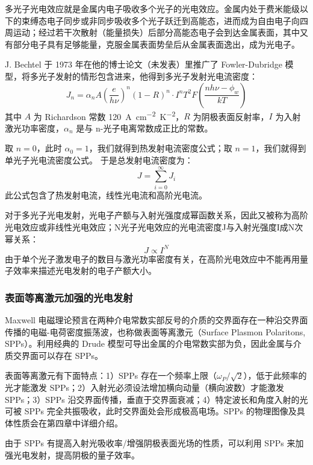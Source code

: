 多光子光电效应就是金属内电子吸收多个光子的光电效应。金属内处于费米能级以下的束缚态电子同步或非同步吸收多个光子跃迁到高能态，进而成为自由电子向四周运动；经过若干次散射（能量损失）后部分高能态电子会到达金属表面，其中又有部分电子具有足够能量，克服金属表面势垒后从金属表面逸出，成为光电子。

	J. Bechtel 于 1973 年在他的博士论文（未发表）里推广了 Fowler-Dubridge 模型\cite{bechtel1975four,bechtel1977two}，将多光子发射的情形包含进来，他得到多光子发射光电流密度：
\begin{equation}
J_n = \alpha_nA\left(\frac{e}{h\nu}\right)^n(1-R)^n\cdot I^nT^2F\left(\frac{nh\nu-\phi_w}{kT}\right)
\label{eq:multi-emission}
\end{equation}
其中 $A$ 为 Richardson 常数 \SI{120}{A.cm^{-2}.K^{-2}}，$R$ 为阴极表面反射率，$I$ 为入射激光功率密度，$\alpha_n$ 是与 n-光子电离常数成正比的常数。
	
	取 $n=0$，此时 $\alpha_0 = 1$，我们就得到热发射电流密度公式；取 $n=1$，我们就得到单光子光电流密度公式。
	于是总发射电流密度为：
	\begin{equation}
	J = \sum_{i = 0}^{\infty}J_i
	\end{equation}
	此公式包含了热发射电流，线性光电流和高阶光电流。

对于多光子光电发射，光电子产额与入射光强度成幂函数关系，因此又被称为高阶光电效应或非线性光电效应；N光子光电效应的光电流密度J与入射光强度I成N次幂关系：
\[
J \propto I^N
\]
由于单个光子激发电子的数目与激光功率密度有关，在高阶光电效应中不能再用量子效率来描述光电发射的电子产额大小。

\subsubsection{表面等离激元加强的光电发射}
Maxwell 电磁理论预言在两种介电常数实部反号的介质的交界面存在一种沿交界面传播的电磁-电荷密度振荡波，也称做表面等离激元（Surface Plasmon Polaritons, SPPs）\cite{Ritchie:1957aa,Barnes:2003aa,Maier:2007ab,Pitarke:2007aa}。利用经典的 Drude 模型可导出金属的介电常数实部为负，因此金属与介质交界面可以存在 SPPs。

表面等离激元有下面特点：1）SPPs 存在一个频率上限（$\omega_P/\sqrt{2}$），低于此频率的光才能激发 SPPs；2）入射光必须设法增加横向动量（横向波数）才能激发 SPPs；3）SPPs 沿交界面传播，垂直于交界面衰减；4）特定波长和角度入射的光可被 SPPs 完全共振吸收，此时交界面处会形成极高电场。SPPs 的物理图像及具体性质会在第四章中详细介绍。

由于 SPPs 有提高入射光吸收率/增强阴极表面光场的性质，可以利用 SPPs 来加强光电发射，提高阴极的量子效率\cite{Tsang:1991aa,Neo:2012aa,Grubisic:2012aa,Polyakov:2013ab,Li:2013aa}。

